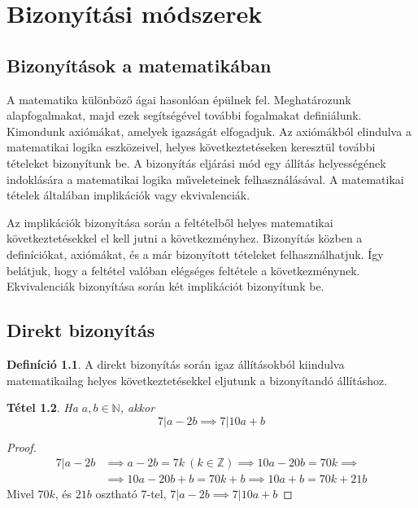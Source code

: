 \documentclass[twoside,12pt]{report}
\newtheorem{theorem}{Tétel}[section]
\theoremstyle{definition}
\newtheorem{definition}[theorem]{Definíció}
\begin{document}
\chapter{Bizonyítási módszerek}
\section{Bizonyítások a matematikában}
	A matematika különböző ágai hasonlóan épülnek fel. Meghatározunk alapfogalmakat, majd ezek	segítségével további fogalmakat definiálunk. Kimondunk axiómákat, amelyek igazságát elfogadjuk. Az axiómákból elindulva a matematikai logika eszközeivel, helyes következtetéseken keresztül további tételeket bizonyítunk be. A bizonyítás eljárási mód egy állítás helyességének indoklására a matematikai logika műveleteinek felhasználásával. A matematikai tételek általában implikációk vagy ekvivalenciák.
	
	Az implikációk bizonyítása során a feltételből helyes matematikai következtetésekkel el kell jutni
	a következményhez. Bizonyítás közben a definíciókat, axiómákat, és a már bizonyított tételeket
	felhasználhatjuk. Így belátjuk, hogy a feltétel valóban elégséges feltétele a következménynek.
	Ekvivalenciák bizonyítása során két implikációt bizonyítunk be.
\section{Direkt bizonyítás}
	\begin{definition}
		A direkt bizonyítás során igaz állításokból kiindulva matematikailag helyes következtetésekkel eljutunk a bizonyítandó állításhoz.
	\end{definition}
	\begin{theorem}
		Ha $a,b\in\mathbb{N}$, akkor
		\begin{equation*}
			7|a-2b\implies 7|10a+b
		\end{equation*}
	\end{theorem}
	\begin{proof}
		\begin{align*}
			7|a-2b&\implies a-2b=7k\ (k\in\mathbb{Z})\implies 10a-20b=70k\implies\\
			&\implies 10a-20b+b=70k+b\implies 10a+b=70k+21b
		\end{align*}
		Mivel $70k$, és $21b$ osztható 7-tel, $7|a-2b\implies 7|10a+b$
	\end{proof}
\end{document}
